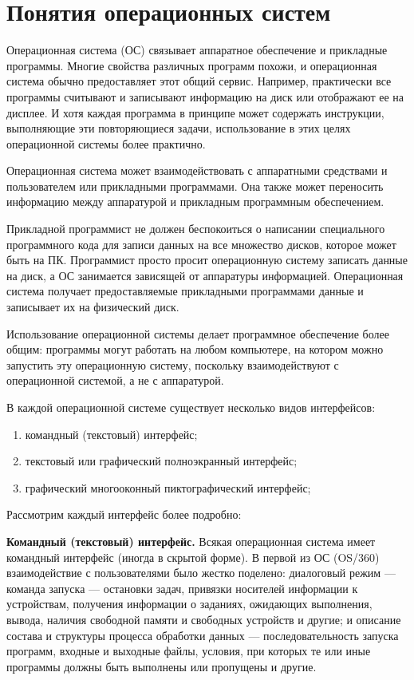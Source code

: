 \documentclass[14pt]{article}
\begin{document}
    \newpage
    \section{Понятия операционных систем}

    Операционная система (ОС) связывает аппаратное обеспечение и прикладные программы.
    Многие свойства различных программ похожи, и операционная система обычно предоставляет этот общий сервис.
    Например, практически все программы считывают и записывают информацию на диск или отображают ее на дисплее.
    И хотя каждая программа в принципе может содержать инструкции, выполняющие эти повторяющиеся задачи, использование в этих целях операционной системы более практично.

    Операционная система может взаимодействовать с аппаратными средствами и пользователем или прикладными программами.
    Она также может переносить информацию между аппаратурой и прикладным программным обеспечением.

    Прикладной программист не должен беспокоиться о написании специального программного кода для записи данных на все множество дисков, которое может быть на ПК.
    Программист просто просит операционную систему записать данные на диск, а ОС занимается зависящей от аппаратуры информацией.
    Операционная система получает предоставляемые прикладными программами данные и записывает их на физический диск.

    Использование операционной системы делает программное обеспечение более общим: программы могут работать на любом компьютере, на котором можно запустить эту операционную систему, поскольку взаимодействуют с операционной системой, а не с аппаратурой.

    В каждой операционной системе существует несколько видов интерфейсов:
    \begin{enumerate}
        \item командный (текстовый) интерфейс;
        \item текстовый или графический полноэкранный интерфейс;
        \item графический многооконный пиктографический интерфейс;
    \end{enumerate}

    Рассмотрим каждый интерфейс более подробно:

    \textbf{Командный (текстовый) интерфейс.}
    Всякая операционная система имеет командный интерфейс (иногда в скрытой форме).
    В первой из ОС (OS/360) взаимодействие с пользователями было жестко поделено: диалоговый режим --- команда запуска --- остановки задач, привязки носителей информации к устройствам, получения информации о заданиях, ожидающих выполнения, вывода, наличия свободной памяти и свободных устройств и другие;
    и описание состава и структуры процесса обработки данных --- последовательность запуска программ, входные и выходные файлы, условия, при которых те или иные программы должны быть выполнены или пропущены и другие.
\end{document}
